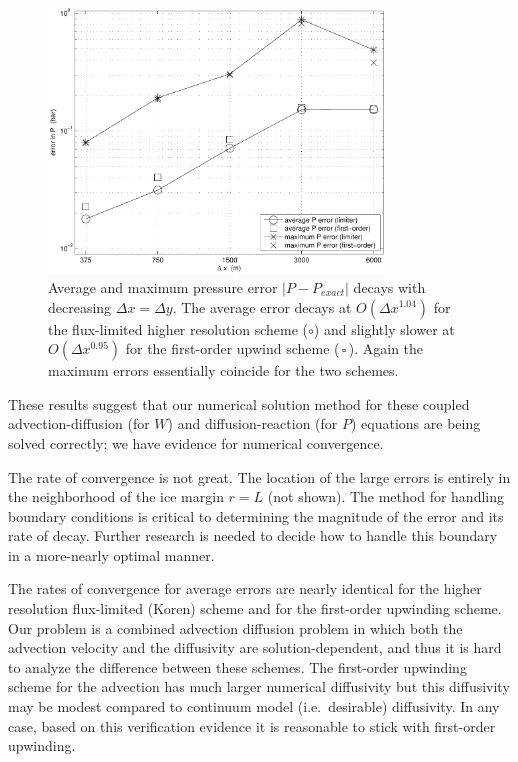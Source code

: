 \documentclass[11pt,final]{amsart}%
\begin{document}
\begin{figure}[ht]
\includegraphics[width=3.5in,keepaspectratio=true]{figs/refineP}
\caption{Average and maximum pressure error $|P-P_{exact}|$ decays with decreasing $\Delta x = \Delta y$.  The average error decays at $O(\Delta x^{1.04})$ for the flux-limited higher resolution scheme (\Large$\circ$\normalsize) and slightly slower at $O(\Delta x^{0.95})$ for the first-order upwind scheme (\scriptsize\,$\square$\,\normalsize).  Again the maximum errors essentially coincide for the two schemes.}
\label{fig:refineP}
\end{figure}

These results suggest that our numerical solution method for these coupled advection-diffusion (for $W$) and diffusion-reaction (for $P$) equations are being solved correctly; we have evidence for numerical convergence.

The rate of convergence is not great.  The location of the large errors is entirely in the neighborhood of the ice margin $r=L$ (not shown).  The method for handling boundary conditions is critical to determining the magnitude of the error and its rate of decay.  Further research is needed to decide how to handle this boundary in a more-nearly optimal manner.

The rates of convergence for average errors are nearly identical for the higher resolution flux-limited (Koren) scheme and for the first-order upwinding scheme.  Our problem is a combined advection diffusion problem in which both the advection velocity and the diffusivity are solution-dependent, and thus it is hard to analyze the difference between these schemes.  The first-order upwinding scheme for the advection has much larger numerical diffusivity but this diffusivity may be modest compared to continuum model (i.e.~desirable) diffusivity.  In any case, based on this verification evidence it is reasonable to stick with first-order upwinding.
\end{document}
